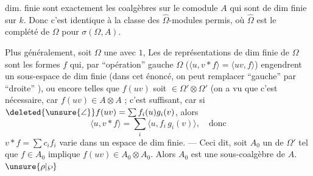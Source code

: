 dim. finie sont exactement les coalgèbres 
sur le comodule $A$ qui sont de dim finie
sur $k$. Donc c'est identique à la classe des
$\widehat\Omega$-modules permis, où $\widehat\Omega$ est le
complété de $\Omega$ pour $\sigma(\Omega,A)$.

Plus généralement, soit $\Omega$ une 
avec $1$, 
 
Les  de représentations
 de dim finie de $\Omega$ sont les
formes $f$ qui, par ``opération''  gauche
 $\Omega$ ($\langle u,v*f\rangle=\langle uv,f\rangle$) engendrent un
sous-espace de dim finie 
\margin{\[\begin{aligned}v*f_{x,x'}&=f_{vx,x'},\\ f_{x,x'}*v&=f_{x,{}^tv.x'}\end{aligned}\]}
(dans cet énoncé, on peut remplacer ``gauche''
par ``droite'' ), ou encore telles que
$f(uv)$ soit $\in\Omega'\otimes\Omega'$ (on a vu que
c'est nécessaire, car $f(uv)\in A\otimes A$ ;
c'est suffisant, car si $\deleted{\unsure{\angle}} f(uv)=
\sum f_i(u)g_i(v)$, alors
\[
\langle u,v*f\rangle=\sum_i\langle u,f_i\,g_i(v)\rangle,\quad\text{donc}
\]
$v*f=\sum c_i f_i$ varie dans un espace
de dim finie. --- Ceci dit,
soit $A_0$ un   de $\Omega'$ tel
que $f\in A_0$ implique $f(uv)\in A_0\otimes A_0$.
Alors $A_0$ est une sous-coalgèbre de $A$.$\unsure{\rho|\wp}$
